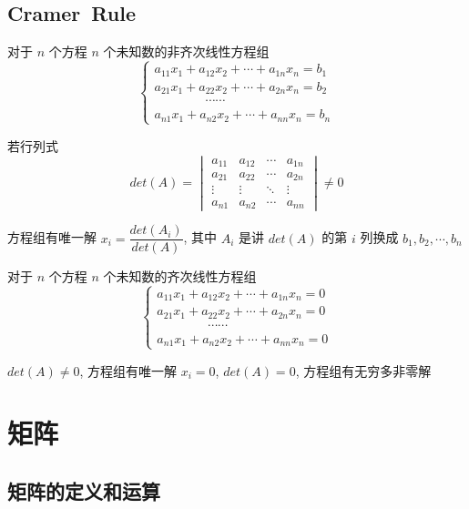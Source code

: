 \section{Cramer\ Rule}
\begin{theorem}
	对于 $n$ 个方程 $n$ 个未知数的非齐次线性方程组
	$$\begin{cases}
	  a_{11}x_{1} + a_{12}x_{2} + \cdots + a_{1n}x_{n} = b_{1}\\
	  a_{21}x_{1} + a_{22}x_{2} + \cdots + a_{2n}x_{n} = b_{2}\\
	  \qquad \qquad \cdots\cdots\\
	  a_{n1}x_{1} + a_{n2}x_{2} + \cdots + a_{nn}x_{n} = b_{n}
	\end{cases}$$

	若行列式 
	$$det(A) = \begin{vmatrix}
		a_{11} & a_{12} & \cdots & a_{1n}\\
		a_{21} & a_{22} & \cdots & a_{2n}\\
		\vdots & \vdots & \ddots & \vdots\\
		a_{n1} & a_{n2} & \cdots & a_{nn}
	\end{vmatrix}\neq 0$$

	方程组有唯一解 $x_{i} = \dfrac{det(A_{i})}{det(A)}$, 其中 $A_{i}$ 是讲 $det(A)$ 的第 $i$ 列换成 $b_{1}, b_{2}, \cdots, b_{n}$

	对于 $n$ 个方程 $n$ 个未知数的齐次线性方程组
	$$\begin{cases}
	  a_{11}x_{1} + a_{12}x_{2} + \cdots + a_{1n}x_{n} = 0\\
	  a_{21}x_{1} + a_{22}x_{2} + \cdots + a_{2n}x_{n} = 0\\
	  \qquad \qquad \cdots\cdots\\
	  a_{n1}x_{1} + a_{n2}x_{2} + \cdots + a_{nn}x_{n} = 0
	\end{cases}$$

	$det(A)\neq 0$, 方程组有唯一解 $x_{i} = 0$, $det(A) = 0$, 方程组有无穷多非零解

\end{theorem}


\chapter{矩阵}
\section{矩阵的定义和运算}
